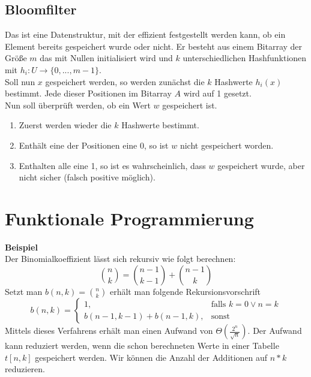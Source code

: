 \documentclass[a4paper, 12pt]{article}
\begin{document}
	\subsection{Bloomfilter}
	Das ist eine Datenstruktur, mit der effizient festgestellt werden kann, ob ein Element bereits gespeichert wurde oder nicht. Er besteht aus einem Bitarray der Größe $m$ das mit Nullen initialisiert wird und $k$ unterschiedlichen Hashfunktionen mit $h_i: U \to \{0,...,m-1\}$.\\
	Soll nun $x$ gespeichert werden, so werden zunächst die $k$ Hashwerte $h_i(x)$ bestimmt. Jede dieser Positionen im Bitarray $A$ wird auf 1 gesetzt.\\
	Nun soll überprüft werden, ob ein Wert $w$ gespeichert ist. \begin{enumerate}
		\item Zuerst werden wieder die $k$ Hashwerte bestimmt.
		\item Enthält eine der Positionen eine 0, so ist $w$ nicht gespeichert worden.
		\item Enthalten alle eine 1, so ist es wahrscheinlich, dass $w$ gespeichert wurde, aber nicht sicher (falsch positive möglich). 
	\end{enumerate} 
	\section{Funktionale Programmierung}
	\textbf{Beispiel}\\
	Der Binomialkoeffizient lässt sich rekursiv wie folgt berechnen: \[\binom{n}{k} = \binom{n-1}{k-1} + \binom{n-1}{k}\]
	Setzt man $b(n,k) = \binom{n}{k}$ erhält man folgende Rekursionsvorschrift \[b(n,k) = \begin{cases}
		1,& \text{falls } k=0 \lor n=k\\
		b(n-1, k-1) + b(n-1, k),& \text{sonst}
	\end{cases}\] 
	Mittels dieses Verfahrens erhält man einen Aufwand von $\Theta(\frac{2^n}{\sqrt{n}})$. Der Aufwand kann reduziert werden, wenn die schon berechneten Werte in einer Tabelle $t[n,k]$ gespeichert werden. Wir können die Anzahl der Additionen auf $n*k$ reduzieren.\\
	
\end{document}
